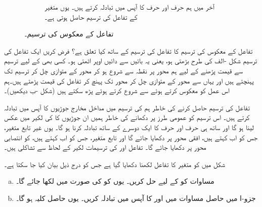 \begin{figure}
\begin{subfigure}{0.45\textwidth}
\caption{
آخر میں ہم حرف  اور حرف  کا آپس میں تبادلہ  کرتے ہیں۔ یوں متغیر  کے تفاعل  کی ترسیم حاصل ہوتی ہے۔ 
}
\end{subfigure}
\caption{تفاعل  کے معکوس  کی ترسیم۔}
\label{شکل_ماورائی_تفاعل_کے_الٹ-کی_ترسیم}
\end{figure}
تفاعل کے معکوس کی ترسیم کا تفاعل کی ترسیم کے ساتھ کیا تعلق ہے؟ فرض کریں ایک تفاعل کی ترسیم شکل  -الف کی طرح  بڑھتی ہو، یعنی یہ بائیں سے دائیں اوپر اٹھتی  ہو۔ کسی بھی  کے لیے ترسیم سے قیمت پڑھنے کے لیے ہم محور  پر نقطہ  سے شروع ہو کر محور  کے متوازی چل کر ترسیم تک پہنچتے ہیں اور یہاں سے محور  کے متوازی چل کر محور  تک پہنچ کر تفاعل کی قیمت  پڑھتے ہیں۔ہم اس عمل کو معکوس کرتے ہوئے  سے شروع کرتے ہوئے  پڑھ سکتے ہیں (شکل -ب دیکھیں)۔

تفاعل  کی ترسیم حاصل کرنے کی خاطر ہم  کی ترسیم میں مداخل مخارج جوڑیوں  کا آپس میں تبادلہ  کرتے ہیں۔ اس ترسیم کو عمومی طرز پر دکھانے کی خاطر ہمیں ان جوڑیوں کا  کی لکیر  میں عکس لینا ہو گا اور ساتھ ہی  حرف  اور حرف  کا ایک دوسرے کے ساتھ تبادلہ کرنا ہو گا۔ یوں غیر تابع متغیر، جس کو اب  کہتے ہیں، افقی محور پر دکھایا جائے گا اور تابع متغیر، جس کو اب  کہتے ہیں، کو انتصابی محور پر دکھایا جائے گا۔ تفاعل  اور  کی ترسیمات لکیر  کے لحاظ سے تشاکلی ہیں۔

شکل  میں  کو متغیر  کا تفاعل لکھنا دکھایا گیا ہے جس کو درج ذیل بیان کیا جا سکتا ہے۔
\begin{enumerate}[a.]
\item
مساوات  کو   کے لیے حل کریں۔ یوں  کو  کی صورت میں لکھا جائے گا۔
\item
جزو-ا میں حاصل مساوات میں  اور  کا آپس میں تبادلہ کریں۔ یوں حاصل کلیہ  ہو گا۔
\end{enumerate} 

